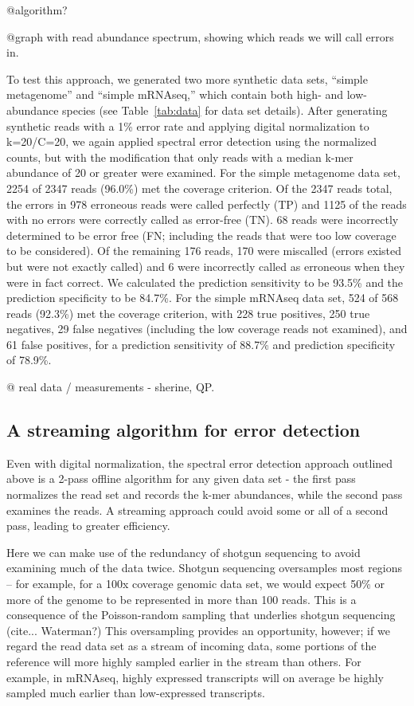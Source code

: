 \documentclass{article}
\begin{document}
@algorithm?

@graph with read abundance spectrum, showing which reads we will
call errors in.


To test this approach, we generated two more synthetic data sets,
``simple metagenome'' and ``simple mRNAseq,'' which contain both high-
and low-abundance species (see Table~\ref{tab:data} for data set
details).  After generating synthetic reads with a 1\% error rate and
applying digital normalization to k=20/C=20, we again applied spectral
error detection using the normalized counts, but with the modification
that only reads with a median k-mer abundance of 20 or greater were
examined.  For the simple metagenome data set, 2254 of 2347 reads
(96.0\%) met the coverage criterion.  Of the 2347 reads total, the
errors in 978 erroneous reads were called perfectly (TP) and 1125 of
the reads with no errors were correctly called as error-free (TN).  68
reads were incorrectly determined to be error free (FN; including the
reads that were too low coverage to be considered).  Of the remaining
176 reads, 170 were miscalled (errors existed but were not exactly
called) and 6 were incorrectly called as erroneous when they were in
fact correct.  We calculated the prediction sensitivity to be 93.5\%
and the prediction specificity to be 84.7\%.  For the simple mRNAseq
data set, 524 of 568 reads (92.3\%) met the coverage criterion, with
228 true positives, 250 true negatives, 29 false negatives (including
the low coverage reads not examined), and 61 false positives, for a
prediction sensitivity of 88.7\% and prediction specificity of 78.9\%.

@ real data / measurements - sherine, QP.

\subsection{A streaming algorithm for error detection}

Even with digital normalization, the spectral error detection approach
outlined above is a 2-pass offline algorithm for any given data set -
the first pass normalizes the read set and records the k-mer
abundances, while the second pass examines the reads.  A streaming
approach could avoid some or all of a second pass, leading to
greater efficiency.

Here we can make use of the redundancy of shotgun sequencing to avoid
examining much of the data twice. Shotgun
sequencing oversamples most regions -- for example, for a 100x
coverage genomic data set, we would expect 50\% or more of the genome
to be represented in more than 100 reads.  This is a consequence of
the Poisson-random sampling that underlies shotgun sequencing
(cite... Waterman?)  This oversampling provides an opportunity,
however; if we regard the read data set as a stream of incoming data,
some portions of the reference will more highly sampled earlier in the
stream than others.  For example, in mRNAseq, highly expressed
transcripts will on average be highly sampled much earlier than
low-expressed transcripts.
\end{document}
